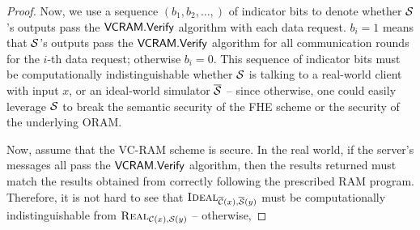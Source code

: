 {\begin{proof}
Now, we use a sequence $(b_1, b_2, \ldots, )$ of indicator bits
to denote whether
$\mathcal{S}$'s outputs pass the $\mathsf{VCRAM}.\mathsf{Verify}$
algorithm with each data request. $b_i = 1$ means that $\mathcal{S}$'s outputs
pass the
$\mathsf{VCRAM}.\mathsf{Verify}$
algorithm for all communication rounds for the $i$-th data request; otherwise $b_i = 0$.
This sequence of indicator bits
must be computationally indistinguishable whether $\mathcal{S}$ is talking to a
real-world client with input $x$, or an ideal-world simulator $\overline{\mathcal{S}}$ -- since otherwise,
one could easily leverage $\mathcal{S}$
to break the semantic security of the FHE scheme or the security of the underlying ORAM.

Now, assume that the VC-RAM scheme is secure.
In the real world, if the server's messages all pass the
$\mathsf{VCRAM}.\mathsf{Verify}$ algorithm, then the results returned must match the results
obtained from correctly following the prescribed RAM program.
Therefore, it is not hard to see that
$\textsc{Ideal}_{\overline{\mathcal{C}}(x),\overline{\mathcal{S}}(y)}$ must be computationally indistinguishable
from $\textsc{Real}_{\mathcal{C}(x),\mathcal{S}(y)}$ -- otherwise,


\end{proof}
}


